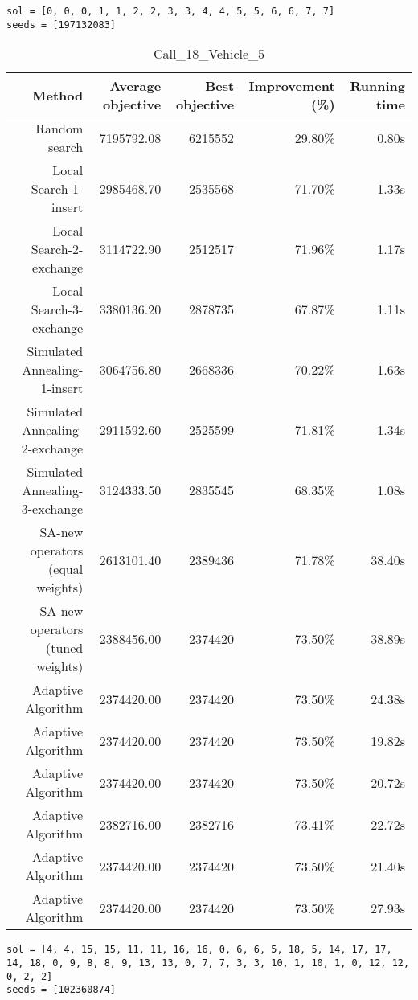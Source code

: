 \begin{lstlisting}[label={lst:call7vehicle3},caption=Optimal solution call\_7\_vehicle\_3]
sol = [0, 0, 0, 1, 1, 2, 2, 3, 3, 4, 4, 5, 5, 6, 6, 7, 7]
seeds = [197132083]
\end{lstlisting}%
\clearpage


\begin{table}[ht]
\centering
\caption{Call\_18\_Vehicle\_5}
\label{tab:call18vehicle5}
\begin{tabular}{|r|r|r|r|r|}
Method & Average objective & Best objective & Improvement (\%) & Running time \\
\hline
Random search & 7195792.08 & 6215552 & 29.80\% & 0.80s\\
Local Search-1-insert & 2985468.70 & 2535568 & 71.70\% & 1.33s\\
Local Search-2-exchange & 3114722.90 & 2512517 & 71.96\% & 1.17s\\
Local Search-3-exchange & 3380136.20 & 2878735 & 67.87\% & 1.11s\\
Simulated Annealing-1-insert & 3064756.80 & 2668336 & 70.22\% & 1.63s\\
Simulated Annealing-2-exchange & 2911592.60 & 2525599 & 71.81\% & 1.34s\\
Simulated Annealing-3-exchange & 3124333.50 & 2835545 & 68.35\% & 1.08s\\
SA-new operators (equal weights) & 2613101.40 & 2389436 & 71.78\% & 38.40s\\
SA-new operators (tuned weights) & 2388456.00 & 2374420 & 73.50\% & 38.89s\\
Adaptive Algorithm & 2374420.00 & 2374420 & 73.50\% & 24.38s\\
Adaptive Algorithm & 2374420.00 & 2374420 & 73.50\% & 19.82s\\
Adaptive Algorithm & 2374420.00 & 2374420 & 73.50\% & 20.72s\\
Adaptive Algorithm & 2382716.00 & 2382716 & 73.41\% & 22.72s\\
Adaptive Algorithm & 2374420.00 & 2374420 & 73.50\% & 21.40s\\
Adaptive Algorithm & 2374420.00 & 2374420 & 73.50\% & 27.93s\\
\end{tabular}%
\end{table}
\begin{lstlisting}[label={lst:call18vehicle5},caption=Optimal solution call\_18\_vehicle\_5]
sol = [4, 4, 15, 15, 11, 11, 16, 16, 0, 6, 6, 5, 18, 5, 14, 17, 17, 14, 18, 0, 9, 8, 8, 9, 13, 13, 0, 7, 7, 3, 3, 10, 1, 10, 1, 0, 12, 12, 0, 2, 2]
seeds = [102360874]
\end{lstlisting}%
\clearpage


